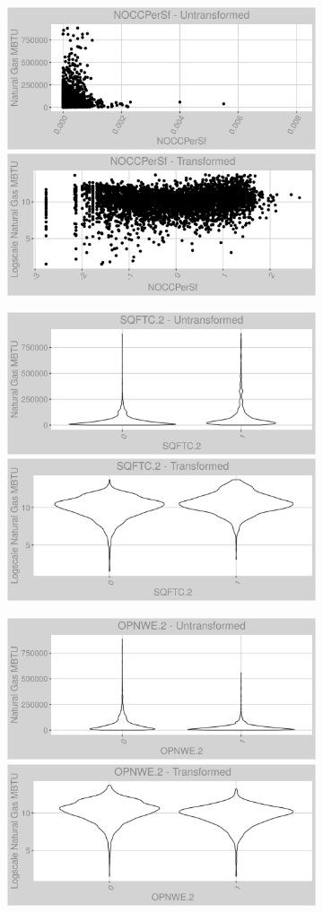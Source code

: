 \FloatBarrier
\newpage
\begin{figure}
\centering
\begin{subfigure}{1\textwidth}
\includegraphics[width=.49\textwidth, height=0.3\textheight]{Images/natural_gas_psf_var_original_12.png}
\includegraphics[width=.49\textwidth, height=0.3\textheight]{Images/natural_gas_psf_var_transformed_12.png}
\end{subfigure}
\begin{subfigure}{1\textwidth}
\centering
\includegraphics[width=.49\textwidth, height=0.3\textheight]{Images/natural_gas_psf_var_original_13.png}
\includegraphics[width=.49\textwidth, height=0.3\textheight]{Images/natural_gas_psf_var_transformed_13.png}
\end{subfigure}
\begin{subfigure}{1\textwidth}
\centering
\includegraphics[width=.49\textwidth, height=0.3\textheight]{Images/natural_gas_psf_var_original_14.png}
\includegraphics[width=.49\textwidth, height=0.3\textheight]{Images/natural_gas_psf_var_transformed_14.png}
\end{subfigure}
\end{figure}
